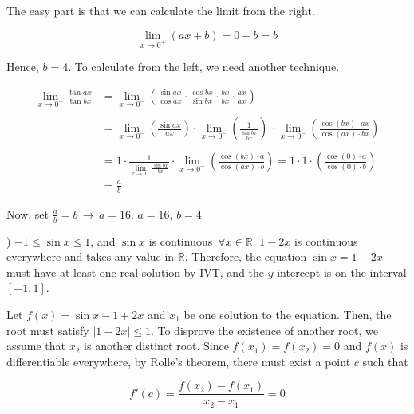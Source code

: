 \documentclass{article}
\begin{document}
\hfill

\noindent The easy part is that we can calculate the limit from the right.

\begin{equation*}
\lim_{x\to0^+} (ax+b) = 0+b = b
\end{equation*}

\hfill

\noindent Hence, $b=4$. To calculate from the left, we need another technique.

\begin{align*}
\lim_{x\to0^-} \frac{\tan ax}{\tan bx} &= \lim_{x\to0^-} \left(\frac{\sin ax}{\cos ax} \cdot \frac{\cos bx}{\sin bx} \cdot \frac{bx}{bx}\cdot \frac{ax}{ax}\right)\\\\&=\lim_{x\to0^-} \left(\frac{\sin ax}{ax} \right)\cdot \lim_{x\to0^-} \left(\frac1{ \frac{\sin bx}{bx}}\right)\ \cdot \lim_{x\to0^-} \left(\frac{\cos (bx) \cdot ax}{\cos(ax) \cdot bx}\right)\\\\&=1\cdot  \frac1{\displaystyle \lim_{x\to0^-}\frac{\sin bx}{bx}}\cdot \lim_{x\to0^-} \left(\frac{\cos (bx) \cdot a}{\cos(ax) \cdot b}\right)= 1\cdot 1\cdot\left(\frac{\cos(0) \cdot a}{\cos(0) \cdot b}\right)\\&=\frac ab
\end{align*}

\hfill

\noindent Now, set $\displaystyle \frac ab = b\,\rightarrow\, a= 16$. $\boxed{a=16,\,b=4}$

\hfill

) $-1 \leq \sin x\leq 1$, and $\sin x$ is continuous $\, \forall x\in \mathbb{R}$. $1-2x$ is continuous everywhere and takes any value in $\mathbb{R}$. Therefore, the equation $\sin x=1-2x$ must have at least one real solution by IVT, and the $y$-intercept is on the interval $[-1, 1]$.

\hfill

\noindent Let $f(x) = \sin x - 1 + 2x$ and $x_1$ be one solution to the equation. Then, the root must satisfy $|1-2x| \leq 1$. To disprove the existence of another root, we assume that $x_2$ is another distinct root. Since $f(x_1) = f(x_2) = 0$ and $f(x)$ is differentiable everywhere, by Rolle's theorem, there must exist a point $c$ such that

\begin{equation*}
f'(c) = \frac{f(x_2) -f(x_1)}{x_2-x_1} = 0
\end{equation*}
\end{document}
